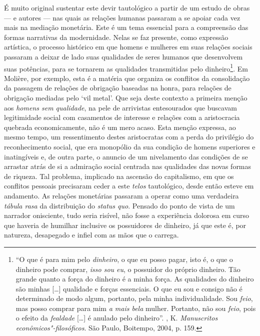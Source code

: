 É muito original sustentar este devir tautológico a partir de um estudo
de obras --- e autores --- nas quais as relações humanas passaram a se
apoiar cada vez mais na mediação monetária. Este é um tema essencial
para a compreensão das formas narrativas da modernidade. Nelas se faz
presente, como expressão artística, o processo histórico em que homens e
mulheres em suas relações sociais passaram a deixar de lado suas
qualidades de seres humanos que desenvolvem suas potências, para se
tornarem as qualidades transmitidas pelo dinheiro\footnote{``O que é
  para mim pelo \emph{dinheiro}, o que eu posso pagar, isto é, o que o
  dinheiro pode comprar, \emph{isso sou eu}, o possuidor do próprio
  dinheiro. Tão grande quanto a força do dinheiro é a minha força. As
  qualidades do dinheiro são minhas [\ldots{}] qualidade e forças
  essenciais. O que eu sou e consigo não é determinado de modo algum,
  portanto, pela minha individualidade. Sou \emph{feio}, mas posso
  comprar para mim \emph{a mais bela} mulher. Portanto, não sou
  \emph{feio}, pois o efeito da \emph{fealdade} [\ldots{}] é anulado
  pelo dinheiro''. , K. \emph{Manuscritos
  econômicos"-filosóficos}. São Paulo, Boitempo, 2004, p. 159.}. Em
Molière, por exemplo, esta é a matéria que organiza os conflitos da
consolidação da passagem de relações de obrigação baseadas na honra,
para relações de obrigação mediadas pelo `vil metal'. Que seja deste
contexto a primeira menção aos \emph{homens sem qualidade}, na pele de
arrivistas entesourados que buscavam legitimidade social com casamentos
de interesse e relações com a aristocracia quebrada economicamente, não
é um mero acaso. Esta menção expressa, ao mesmo tempo, um ressentimento
destes aristocratas com a perda do privilégio do reconhecimento social,
que era monopólio da sua condição de homens superiores e inatingíveis e,
de outra parte, o anuncio de um nivelamento das condições de se arrastar
atrás de si a admiração social centrada nas qualidades das novas formas
de riqueza. Tal problema, implicado na ascensão do capitalismo, em que
os conflitos pessoais precisaram ceder a este \emph{telos} tautológico,
desde então esteve em andamento. As relações monetárias passaram a
operar como uma verdadeira \emph{tábula rasa} da distribuição do
\emph{status quo}. Pensado do ponto de vista de um narrador onisciente,
tudo seria risível, não fosse a experiência dolorosa em curso que
haveria de humilhar inclusive os possuidores de dinheiro, já que este é,
por natureza, desapegado e infiel com as mãos que o carrega.

